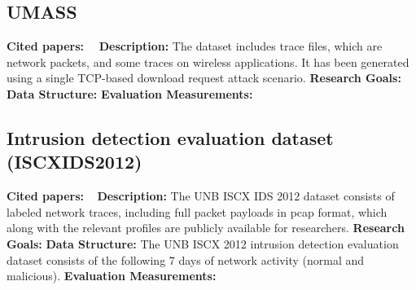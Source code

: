 \subsection{UMASS}
\textbf{Cited papers:}~\cite{nehinbe2011critical}~\cite{prusty2011forensic} \newline
\textbf{Description:} The dataset includes trace files, which are network packets, and some traces on wireless applications. It has been generated using a single TCP-based download request attack scenario.\newline
\textbf{Research Goals:}  \newline
\textbf{Data Structure:} \newline
\textbf{Evaluation Measurements:} \newline






\subsection{Intrusion detection evaluation dataset (ISCXIDS2012)}
\textbf{Cited papers:} ~\cite{shiravi2012toward}\newline
\textbf{Description:} The UNB ISCX IDS 2012 dataset consists of labeled network traces, including full packet payloads in pcap format, which along with the relevant profiles are publicly available for researchers.  \newline
\textbf{Research Goals:}  \newline
\textbf{Data Structure:} The UNB ISCX 2012 intrusion detection evaluation dataset consists of the following 7 days of network activity (normal and malicious). \newline
\textbf{Evaluation Measurements:} \newline









